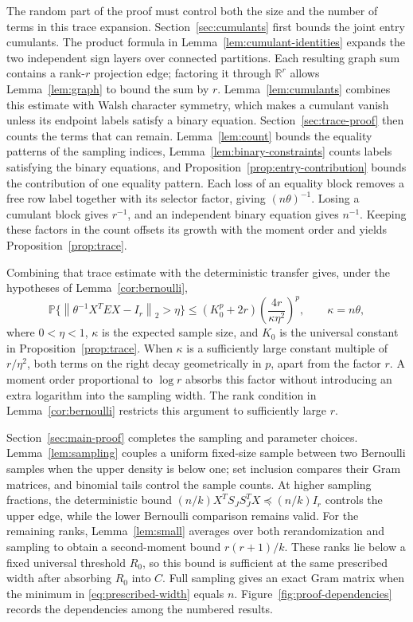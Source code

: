 \documentclass[11pt]{article}
\theoremstyle{definition}
\theoremstyle{remark}
\theoremstyle{plain}
\newcommand{\Prob}{\mathbb P}
\newcommand{\R}{\mathbb R}
\newcommand{\norm}[1]{\left\lVert#1\right\rVert_2}
\begin{document}
The random part of the proof must control both the size and the
number of terms in this trace expansion. Section~\ref{sec:cumulants}
first bounds the joint entry cumulants. The product formula in
Lemma~\ref{lem:cumulant-identities} expands the two independent sign
layers over connected partitions. Each resulting graph sum contains
a rank-$r$ projection edge; factoring it through $\R^r$ allows
Lemma~\ref{lem:graph} to bound the sum by $r$.
Lemma~\ref{lem:cumulants} combines this estimate with Walsh character
symmetry, which makes a cumulant vanish unless its endpoint labels
satisfy a binary equation. Section~\ref{sec:trace-proof} then counts
the terms that can remain. Lemma~\ref{lem:count} bounds the equality
patterns of the sampling indices, Lemma~\ref{lem:binary-constraints}
counts labels satisfying the binary equations, and
Proposition~\ref{prop:entry-contribution} bounds the contribution of
one equality pattern. Each loss of an equality block removes a free
row label together with its selector factor, giving $(n\theta)^{-1}$.
Losing a cumulant block gives $r^{-1}$, and an independent binary
equation gives $n^{-1}$.
Keeping these factors in the count offsets its growth with the
moment order and yields Proposition~\ref{prop:trace}.

Combining that trace estimate with the deterministic transfer gives,
under the hypotheses of Lemma~\ref{cor:bernoulli},
\[
 \Prob\{\norm{\theta^{-1}X^TEX-I_r}>\eta\}
 \le (K_0^p+2r)\left(\frac{4r}{\kappa\eta^2}\right)^p,
 \qquad \kappa=n\theta,
\]
where $0<\eta<1$, $\kappa$ is the expected sample size, and $K_0$
is the universal constant in Proposition~\ref{prop:trace}.
When $\kappa$ is a sufficiently large constant multiple of
$r/\eta^2$, both terms on the right decay geometrically in $p$,
apart from the factor $r$. A moment order proportional to $\log r$
absorbs this factor without introducing an extra logarithm into
the sampling width. The rank condition in
Lemma~\ref{cor:bernoulli} restricts this argument to sufficiently
large $r$.

Section~\ref{sec:main-proof} completes the sampling and parameter
choices. Lemma~\ref{lem:sampling} couples a uniform fixed-size sample
between two Bernoulli samples when the upper density is below one;
set inclusion compares their Gram matrices, and binomial tails
control the sample counts. At higher sampling fractions, the
deterministic bound $(n/k)X^TS_JS_J^TX\preceq(n/k)I_r$ controls
the upper edge, while the lower Bernoulli comparison remains valid.
For the remaining ranks, Lemma~\ref{lem:small} averages over both
rerandomization and sampling to obtain a second-moment bound
$r(r+1)/k$. These ranks lie below a fixed universal threshold
$R_0$, so this bound is sufficient at the same prescribed width
after absorbing $R_0$ into $C$. Full sampling gives an exact
Gram matrix when the minimum in \eqref{eq:prescribed-width} equals $n$.
Figure~\ref{fig:proof-dependencies} records the dependencies among
the numbered results.
\end{document}
